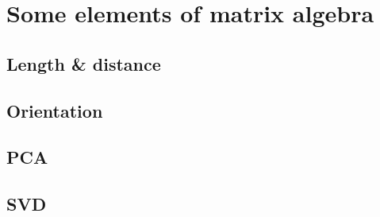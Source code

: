 \section{Some elements of matrix algebra}

\subsection{Length \& distance}

% 





% 

\subsection{Orientation}







% 

\subsection{PCA}











% 

\subsection{SVD}



